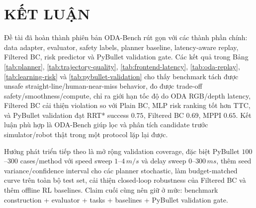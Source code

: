 \documentclass[10pt,letterpaper,twocolumn]{article}
\begin{document}
\section{KẾT LUẬN}
Đề tài đã hoàn thành phiên bản ODA-Bench rút gọn với các thành phần chính: data adapter, evaluator, safety labels, planner baseline, latency-aware replay, Filtered BC, risk predictor và PyBullet validation gate. Các kết quả trong Bảng \ref{tab:planner}, \ref{tab:trajectory-quality}, \ref{tab:frontend-latency}, \ref{tab:oda-replay}, \ref{tab:learning-risk} và \ref{tab:pybullet-validation} cho thấy benchmark tách được unsafe straight-line/human-near-miss behavior, đo được trade-off safety/smoothness/compute, chỉ ra giới hạn tốc độ do ODA RGB/depth latency, Filtered BC cải thiện violation so với Plain BC, MLP risk ranking tốt hơn TTC, và PyBullet validation đạt RRT* success \(0.75\), Filtered BC \(0.69\), MPPI \(0.65\). Kết luận phù hợp là ODA-Bench giúp lọc và phân tích candidate trước simulator/robot thật trong một protocol lặp lại được.

Hướng phát triển tiếp theo là mở rộng validation coverage, đặc biệt PyBullet \(100\)--\(300\) cases/method với speed sweep \(1\)--\(4\,m/s\) và delay sweep \(0\)--\(300\,ms\), thêm seed variance/confidence interval cho các planner stochastic, làm budget-matched curve trên toàn bộ test set, cải thiện closed-loop robustness của Filtered BC và thêm offline RL baselines. Claim cuối cùng nên giữ ở mức: benchmark construction + evaluator + tasks + baselines + PyBullet validation gate.
\end{document}
